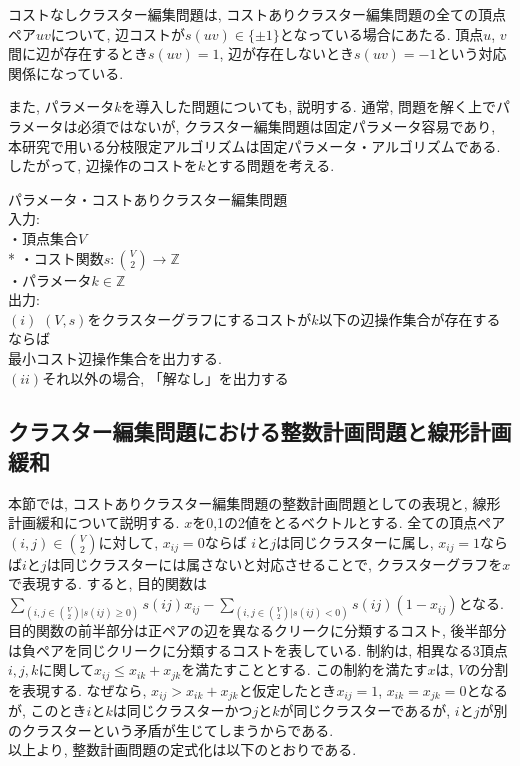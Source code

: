 \documentclass[10.5,a4paper,titlepage, dvipdfmx]{bxjsarticle}
\begin{document}
コストなしクラスター編集問題は, コストありクラスター編集問題の全ての頂点ペア$uv$について, 辺コストが$s(uv) \in \{\pm 1\}$となっている場合にあたる.
頂点$u$, $v$間に辺が存在するとき$s(uv)=1$, 辺が存在しないとき$s(uv)=-1$という対応関係になっている.\par
また, パラメータ$k$を導入した問題についても, 説明する. 通常, 問題を解く上でパラメータは必須ではないが, クラスター編集問題は固定パラメータ容易であり, 本研究で用いる分枝限定アルゴリズムは固定パラメータ・アルゴリズムである.
したがって, 辺操作のコストを$k$とする問題を考える.

\begin{screen}
    $\textbf{パラメータ・コストありクラスター編集問題}$ \\
    入力: \\
    \hspace{15pt} ・頂点集合$V$ \\*
    \hspace{15pt} ・コスト関数$s: \binom{V}{2} \rightarrow \mathbb{Z} $\\
    \hspace{15pt} ・パラメータ$k \in \mathbb{Z}$ \\
    出力: \\
    \hspace{15pt} $(i)$ $(V,s)$をクラスターグラフにするコストが$k$以下の辺操作集合が存在するならば\\
    \hspace{15pt} \hspace{15pt}最小コスト辺操作集合を出力する. \\
    \hspace{15pt} $(ii)$それ以外の場合, 「解なし」を出力する
\end{screen}


\subsection{クラスター編集問題における整数計画問題と線形計画緩和}
本節では, コストありクラスター編集問題の整数計画問題としての表現と, 線形計画緩和について説明する.
$x$を0,1の2値をとるベクトルとする. 全ての頂点ペア$(i,j) \in \binom{V}{2}$に対して, $x_{ij}=0$ならば
$i$と$j$は同じクラスターに属し, $x_{ij}=1$ならば$i$と$j$は同じクラスターには属さないと対応させることで, クラスターグラフを$x$で表現する.
すると, 目的関数は$\sum_{(i,j \in \binom{V}{2}| s(ij) \ge 0)} s(ij) x_{ij} - \sum_{(i,j \in \binom{V}{2}| s(ij) < 0)} s(ij) (1-x_{ij}) $となる.
目的関数の前半部分は正ペアの辺を異なるクリークに分類するコスト, 後半部分は負ペアを同じクリークに分類するコストを表している.
制約は, 相異なる3頂点$i,j,k$に関して$x_{ij} \le x_{ik} + x_{jk}$を満たすこととする.
この制約を満たす$x$は, $V$の分割を表現する.
なぜなら, $x_{ij} > x_{ik} + x_{jk}$と仮定したとき$x_{ij}=1$, $x_{ik}=x_{jk}=0$となるが, このとき$i$と$k$は同じクラスターかつ$j$と$k$が同じクラスターであるが,
$i$と$j$が別のクラスターという矛盾が生じてしまうからである.\\
以上より, 整数計画問題の定式化は以下のとおりである.\\
\end{document}
